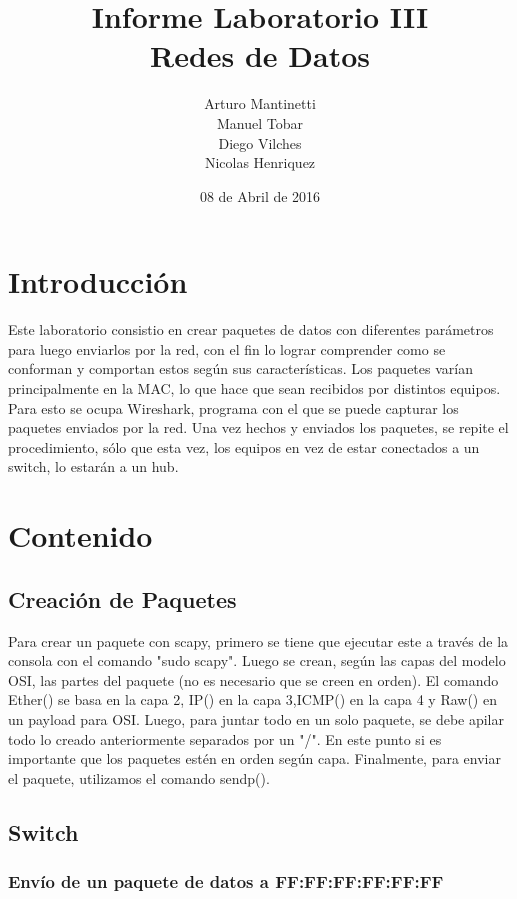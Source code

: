 \documentclass[spanish]{udpreport}
\title{Informe Laboratorio III \\ Redes de Datos}
\author{Arturo Mantinetti \\ Manuel Tobar \\ Diego Vilches \\ Nicolas Henriquez}
\date{08 de Abril de 2016}
\begin{document}
\maketitle

\tableofcontents

\chapter{Introducción}

Este laboratorio consistio en crear paquetes de datos con diferentes parámetros para luego enviarlos por la red, con el fin lo lograr comprender como se conforman y comportan estos según sus características. 
Los paquetes varían principalmente en la MAC, lo que hace que sean recibidos por distintos equipos. Para esto se ocupa Wireshark, programa con el que se puede capturar los paquetes enviados por la red. Una vez hechos y enviados los paquetes, se repite el procedimiento, sólo que esta vez, los equipos en vez de estar conectados a un switch, lo estarán a un hub. 


\chapter{Contenido}

\section{Creación de Paquetes}
Para crear un paquete con scapy, primero se tiene que ejecutar este a través de la consola con el comando "sudo scapy". Luego se crean, según las capas  del modelo OSI, las partes del paquete (no es necesario que se creen en orden). El comando Ether() se basa en la capa 2, IP() en la capa 3,ICMP() en la capa 4 y Raw() en un payload para OSI. Luego, para juntar todo en un solo paquete, se debe apilar todo lo creado anteriormente separados por un "/". En este punto si es importante que los paquetes estén en orden según capa. Finalmente, para enviar el paquete, utilizamos el comando sendp().
  
\section{Switch}

\subsection{Envío de un paquete de datos a FF:FF:FF:FF:FF:FF}
\end{document}
